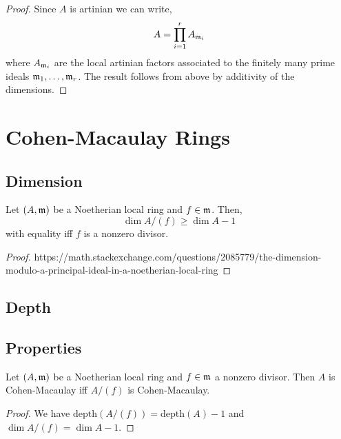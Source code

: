 \documentclass[12pt]{article}
\begin{document}
\begin{proof}
Since $A$ is artinian we can write,
\[ A = \prod_{i = 1}^r A_{\mathfrak{m}_i} \]
where $A_{\mathfrak{m}_i}$ are the local artinian factors associated to the finitely many prime ideals $\mathfrak{m}_1, \dots, \mathfrak{m}_r$. The result follows from above by additivity of the dimensions.
\end{proof}

\section{Cohen-Macaulay Rings}

\subsection{Dimension}

\begin{prop}
Let $(A, \mathfrak{m})$ be a Noetherian local ring and $f \in \mathfrak{m}$. Then,
\[ \dim{A/(f)} \ge \dim{A} - 1 \]
with equality iff $f$ is a nonzero divisor.
\end{prop}

\begin{proof}
https://math.stackexchange.com/questions/2085779/the-dimension-modulo-a-principal-ideal-in-a-noetherian-local-ring
\end{proof}

\subsection{Depth}

\newcommand{\depth}[1]{\mathrm{depth}\left( #1 \right)}

\subsection{Properties}

\begin{prop}
Let $(A, \mathfrak{m})$ be a Noetherian local ring and $f \in \mathfrak{m}$ a nonzero divisor. Then $A$ is Cohen-Macaulay iff $A / (f)$ is Cohen-Macaulay.
\end{prop}

\begin{proof}
We have $\depth{A/(f)} = \depth{A} - 1$ and $\dim{A/(f)} = \dim{A} - 1$.
\end{proof}
\end{document}
